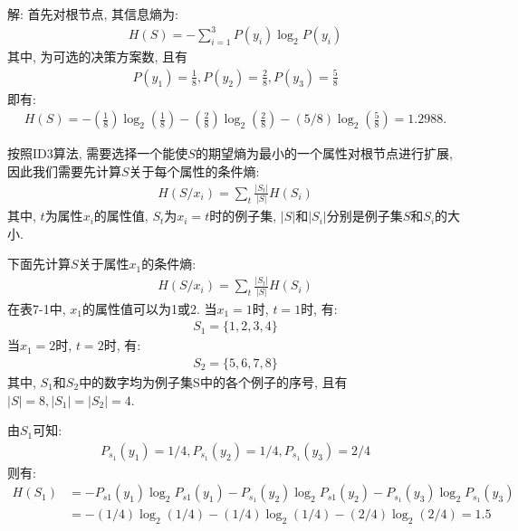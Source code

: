 解:  首先对根节点, 其信息熵为:
\begin{align}
  H(S)=-\sum_{i=1}^{3} P\left(y_{i}\right) \log_ {2} P\left(y_{i}\right)
\end{align}
其中, 为可选的决策方案数, 且有
\begin{align}
  P(y_1)=\frac 1 8, P(y_2)=\frac 2 8, P(y_3)=\frac 5 8
\end{align}
即有:
\begin{align}
  H(S)= -(\frac 1 8)\log_2(\frac 1 8)- (\frac 2 8)\log_ 2(\frac 2 8)- (5/8)\log_ 2(\frac 5 8) =1.2988.
\end{align}

按照ID3算法, 需要选择一个能使$S$的期望熵为最小的一个属性对根节点进行扩展, 因此我们需要先计算$S$关于每个属性的条件熵:
\begin{align}
  H\left(S / x_{i}\right)=\sum_{t} \frac{\left|S_{t}\right|}{|S|} H\left(S_{i}\right)
\end{align}
其中, $t$为属性$x_i$的属性值, $S_t$为$x_i=t$时的例子集, $|S|$和$|S_i|$分别是例子集$S$和$S_i$的大小.

下面先计算$S$关于属性$x_1$的条件熵:
\begin{align}
  H\left(S / x_{i}\right)=\sum_{t} \frac{\left|S_{t}\right|}{|S|} H\left(S_{i}\right)
\end{align}
在表7-1中, $x_1$的属性值可以为1或2. 当$x_1=1$时, $t=1$时, 有:
\begin{align}
  S_1=\{1, 2, 3, 4\}
\end{align}
当$x_1=2$时, $t=2$时, 有:
\begin{align}
  S_2=\{5, 6, 7, 8\}
\end{align}
其中, $S_1$和$S_2$中的数字均为例子集S中的各个例子的序号, 且有$|S|=8,|S_1|=|S_2|=4$.

由$S_1$可知:
\begin{align}
  P_{s_1}(y_1)=1/4,     P_{s_1}(y_2)=1/4,     P_{s_1}(y_3)=2/4
\end{align}
则有:
\begin{align}
H(S_1)&= - P_{s1}(y_1)\log_2 P_{s1}(y_1) - P_{s_1}(y_2)\log_2 P_{s1}(y_2 )- P_{s_1}(y_3)\log_2 P_{s_1}(y_3 )\\
     &= -(1/4)\log_2(1/4)- (1/4)\log_2(1/4)- (2/4)\log_2(2/4) =1.5
\end{align}

